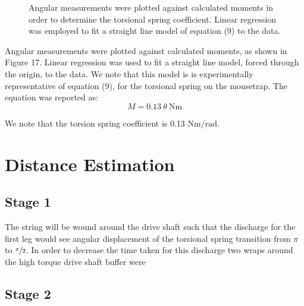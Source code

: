 \documentclass[a4paper]{article}
\begin{document}
\begin{figure}[h]
	\centering
	\caption{Angular measurements were plotted against calculated moments in order to determine the torsional spring coefficient. Linear regression was employed to fit a straight line model of equation (9) to the data.}
\end{figure}

Angular measurements were plotted against calculated moments, as shown in Figure 17. Linear regression was used to fit a straight line model, forced through the origin, to the data. We note that this model is is experimentally representative of equation (9), for the torsional spring on the mousetrap. The equation was reported as:
\begin{equation}
	M = 0.13 \ \theta \ \si{\newton\meter}
\end{equation}

We note that the torsion spring coefficient is 0.13 $\si{\newton\meter\per\radian}$.

\section{Distance Estimation}

\subsection{Stage 1}
The string will be wound around the drive shaft such that the discharge for the first leg would see angular displacement of the torsional spring transition from $\pi$ to $\sfrac{\pi}{2}$. In order to decrease the time taken for this discharge two wraps around the high torque drive shaft buffer were

\subsection{Stage 2}
\end{document}
